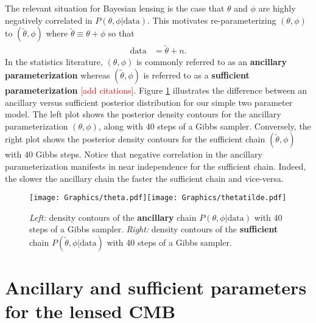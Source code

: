 \documentclass[noinfoline]{imsart}
\begin{document}
The relevant situation for Bayesian lensing is the case that $\theta$ and $\phi$ are highly negatively correlated in $P(\theta, \phi|\text{data})$.  This motivates re-parameterizing $(\theta,\phi)$ to $(\widetilde \theta, \phi)$ where $\widetilde \theta \equiv \theta + \phi$ so that
\begin{align*}
\text{data} &= \widetilde \theta + n.
\end{align*}
In the statistics literature,  $(\theta, \phi)$ is commonly referred to as an {\bf ancillary parameterization} whereas $(\widetilde \theta, \phi)$ is referred to as a {\bf sufficient parameterization} \textcolor{red}{[add citations]}. Figure  \ref{fastslowGibbs} illustrates the difference between an ancillary versus sufficient posterior distribution for our simple two parameter model. The left plot shows the posterior density contours for the ancillary parameterization $(\theta, \phi)$, along with 40 steps of a Gibbs sampler.  Conversely, the right plot shows the posterior density contours for the sufficient chain $(\widetilde \theta, \phi)$ with 40 Gibbs steps. Notice that negative correlation  in the ancillary parameterization manifests in near independence for the sufficient chain.  Indeed, the slower the ancillary chain the faster the sufficient chain and vice-versa. 
\begin{figure}[H]
\label{fastslowGibbs}
\texttt{[image: Graphics/theta.pdf]}\texttt{[image: Graphics/thetatilde.pdf]}
\caption{{\em Left:} density contours of the {\bf ancillary} chain $P(\theta, \phi|\text{data})$ with 40 steps of a Gibbs sampler. {\em Right:} density contours of the {\bf sufficient}  chain $P(\widetilde \theta, \phi|\text{data})$ with 40 steps of a Gibbs sampler.}
\end{figure}
 





	
%
%
\section{Ancillary and sufficient parameters for the lensed CMB}
\end{document}
